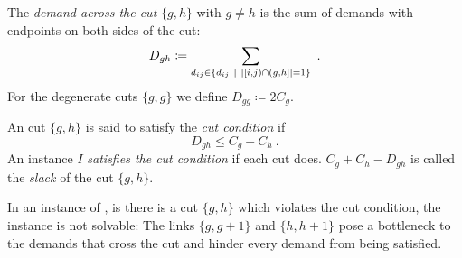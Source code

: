 \begin{definition}
	The \emph{demand across the cut} $\{g, h\}$ with $g \neq h$ is the sum of demands with endpoints on both sides of the cut:
	\begin{equation}
		\label{eq:cut-demand-definition}
		D_{gh} \coloneqq \sum_{d_{ij} \in \{d_{ij}\ |\ \abs{[i, j) \cap (g, h]} = 1\}} \ .
	\end{equation}
	For the degenerate cuts $\{g, g\}$ we define $D_{gg} \coloneqq 2 C_g$.
\end{definition}

\begin{definition}
	An cut $\{g, h\}$ is said to satisfy the \emph{cut condition} if
	\begin{equation}
		D_{gh} \leq C_g + C_h \ .
	\end{equation}
	An instance $I$ \emph{satisfies the cut condition} if each cut does.
	$C_g + C_h - D_{gh}$ is called the \emph{slack} of the cut $\{g, h\}$.
\end{definition}
In an instance of \RRL, is there is a cut $\{g, h\}$ which violates the cut condition, the instance is not solvable:
The links $\{g, g+1\}$ and $\{h, h+1\}$ pose a bottleneck to the demands that cross the cut and hinder every demand from being satisfied.

